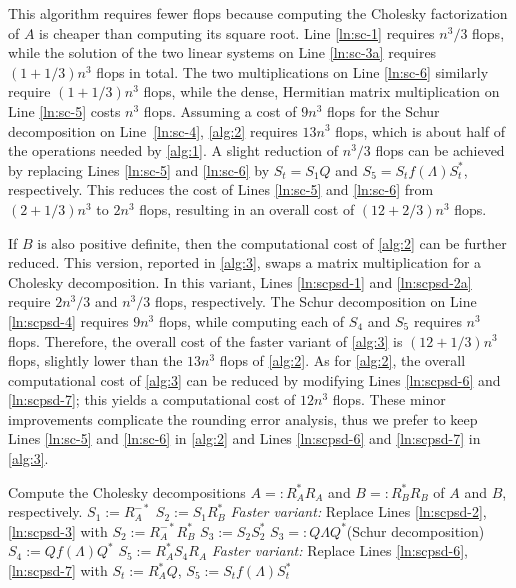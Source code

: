 \documentclass[DIV=14]{scrartcl}
\newcommand{\altline}[1]{\SetNlSty{}{\underline}{} \quad #1 \SetNlSty{}{}{}}
\theoremstyle{thmstyletwo}
\theoremstyle{definition}
\numberwithin{equation}{section}
\newcommand{\deq}{\ensuremath{:=}}
\newcommand{\deqr}{\ensuremath{=:}}
\renewcommand{\Lambda}{\varLambda}
\begin{document}
This algorithm requires fewer flops because computing the Cholesky factorization of $A$ is cheaper than computing its square root.
Line \ref{ln:sc-1} requires $n^3/3$ flops, while the solution of the two linear systems on Line \ref{ln:sc-3a} requires $(1+1/3)n^3$ flops in total.
The two multiplications on Line \ref{ln:sc-6} similarly require $(1+1/3)n^3$ flops, while the dense, Hermitian matrix multiplication on Line \ref{ln:sc-5} costs $n^3$ flops. Assuming a cost of $9n^3$ flops for the Schur decomposition on Line~\ref{ln:sc-4}, \cref{alg:2} requires $13n^3$ flops, which is about half of the operations needed by \cref{alg:1}.
A slight reduction of $n^3/3$ flops can be achieved by
replacing Lines \ref{ln:sc-5} and \ref{ln:sc-6} by $S_t=S_1Q$ and $S_5=S_tf(\Lambda)S_t^*$,
respectively. This reduces the cost of Lines \ref{ln:sc-5} and \ref{ln:sc-6} from
$(2 + 1/3)n^3$ to $2n^3$ flops, resulting in an overall cost of
$(12 + 2/3)n^3$ flops.

If $B$ is also positive definite, then the computational cost of \cref{alg:2} can be further reduced. This version, reported in \cref{alg:3}, swaps a matrix multiplication for a
Cholesky decomposition. In this variant, Lines \ref{ln:scpsd-1} and \ref{ln:scpsd-2a} require $2n^3/3$ and $n^3/3$ flops, respectively. The Schur decomposition on Line \ref{ln:scpsd-4}
requires $9n^3$ flops, while computing each of $S_4$ and $S_5$ requires
$n^3$ flops. Therefore, the overall cost of the faster variant of \cref{alg:3} is $(12 + 1/3)n^3$ flops, slightly lower than the $13n^3$ flops of \cref{alg:2}.
As for \cref{alg:2}, the overall computational cost of \cref{alg:3} can be reduced by modifying Lines \ref{ln:scpsd-6} and \ref{ln:scpsd-7}; this yields a computational cost of $12n^3$ flops.
These minor improvements complicate the rounding error analysis, thus we prefer to keep Lines \ref{ln:sc-5} and \ref{ln:sc-6} in \cref {alg:2} and Lines \ref{ln:scpsd-6} and \ref{ln:scpsd-7} in \cref{alg:3}.

\begin{algorithm2e}[t]
\caption{Improved Cholesky--Schur algorithm for computing $Af(A^{-1}B).$}
\label{alg:3}
Compute the Cholesky decompositions $A\deqr R_A^*R_A$ and $B\deqr R_B^*R_B$ of $A$ and $B$, respectively.\; \label{ln:scpsd-1}
$S_1\deq R_A^{-*}$\; \label{ln:scpsd-2}
$S_2\deq S_1R_B^*$\; \label{ln:scpsd-3}
\altline{\emph{Faster variant:} Replace Lines \ref{ln:scpsd-2}, \ref{ln:scpsd-3} with $S_2\deq R_A^{-*}R_B^*$\;} \label{ln:scpsd-2a}
$S_3\deq S_2S_2^*$\; \label{ln:scpsd-4}
$S_3\deqr Q\Lambda Q^*$\quad (Schur decomposition)\; \label{ln:scpsd-5}
$S_4\deq Qf(\Lambda)Q^*$\; \label{ln:scpsd-6}
$S_5\deq R_A^*S_4R_A $\; \label{ln:scpsd-7}
\altline{\emph{Faster variant:} Replace Lines \ref{ln:scpsd-6}, \ref{ln:scpsd-7} with $S_t\deq R_A^*Q$, $S_5\deq S_tf(\Lambda)S_t^*$\;}
\; \label{ln:scpsd-8}
\end{algorithm2e}
\end{document}
